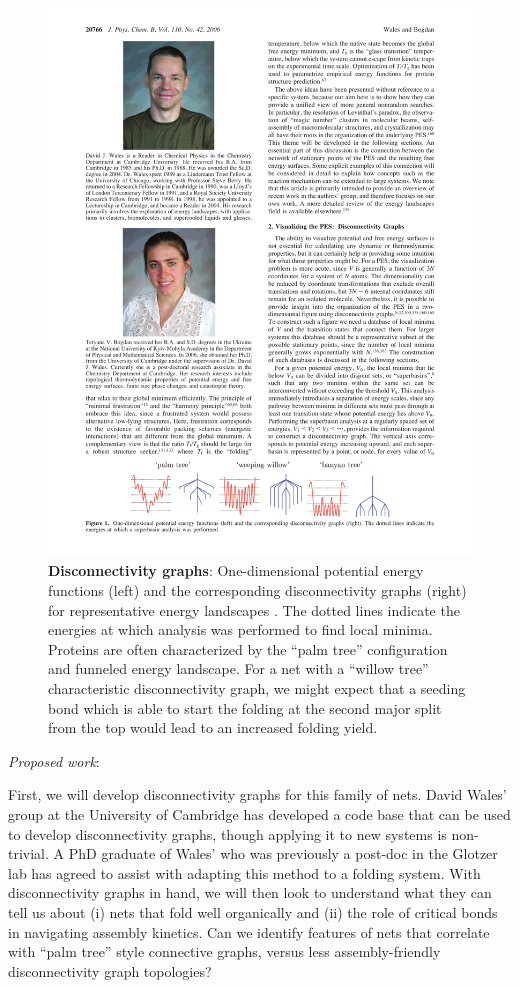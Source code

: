 \begin{figure}[bt]
\begin{center}
\includegraphics{../Figures/disconnectivity.pdf}
\caption{
\textbf{Disconnectivity graphs}:
One-dimensional potential energy functions (left) and the corresponding disconnectivity graphs (right) for representative energy landscapes \cite{Wales_2006_JChemPhysB}.
The dotted lines indicate the energies at which analysis was performed to find local minima.
Proteins are often characterized by the ``palm tree'' configuration and funneled energy landscape.
For a net with a ``willow tree'' characteristic disconnectivity graph, we might expect that a seeding bond which is able to start the folding at the second major split from the top would lead to an increased folding yield.}
\label{fig:disconnectivity}
\end{center}
\end{figure}


\textit{Proposed work}:

First, we will develop disconnectivity graphs for this family of nets.
David Wales' group at the University of Cambridge has developed a code base that can be used to develop disconnectivity graphs, though applying it to new systems is non-trivial.
A PhD graduate of Wales' who was previously a post-doc in the Glotzer lab has agreed to assist with adapting this method to a folding system.
With disconnectivity graphs in hand, we will then look to understand what they can tell us about (i) nets that fold well organically and (ii) the role of critical bonds in navigating assembly kinetics.
Can we identify features of nets that correlate with ``palm tree'' style connective graphs, versus less assembly-friendly disconnectivity graph topologies?

